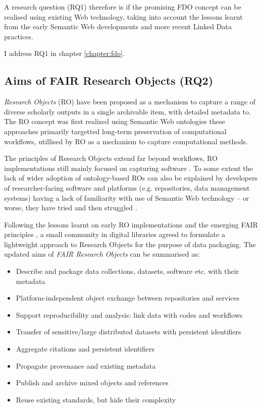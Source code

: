 A research question (RQ1) therefore is if the promising FDO concept can be realised using existing Web technology, taking into account the lessons learnt from the early Semantic Web developments and more recent Linked Data practices. 

I address RQ1 in chapter \vref{chapter:fdo}.


\subsection{Aims of FAIR Research Objects (RQ2)}

\emph{Research Objects} (RO) \cite{Bechhofer 2013} have been proposed as a mechanism to capture a range of diverse scholarly outputs in a single archivable item, with detailed metadata to. The RO concept was first realized using Semantic Web ontologies \cite{ch5-92,Belhajjame 2015} these approaches primarily targetted long-term preservation of computational workflows, utillised by RO as a mechanism to capture computational methods.

The principles of Research Objects extend far beyond workflows, RO implementations still mainly focused on capturing software \cite{goble-ro2018}. To some extent the lack of wider adoption of ontology-based ROs can also be explained by developers of researcher-facing software and platforms (e.g. repositories, data management systems) having a lack of familiarity with use of Semantic Web technology -- or worse, they have tried and then struggled \cite{carrieroLandscapeOntologyReuse2020a,Tudorache 2020}.

Following the lessons learnt on early RO implementations and the emerging FAIR principles \cite{Wilkinson 2016,Jacobsen 2020}, a small community in digital libraries agreed to formulate a lightweight approach to Research Objects \cite{Sefton 2018,10.5281/zenodo.3337883} for the purpose of data packaging. The updated aims of \emph{FAIR Research Objects} can be summarised as:
 
\begin{itemize}
    \item Describe and package data collections, datasets, software etc. with their metadata
    \item Platform-independent object exchange between repositories and services
    \item Support reproducibility and analysis: link data with codes and workflows
    \item Transfer of sensitive/large distributed datasets with persistent identifiers
    \item Aggregate citations and persistent identifiers
    \item Propagate provenance and existing metadata
    \item Publish and archive mixed objects and references
    \item Reuse existing standards, but hide their complexity
\end{itemize}

